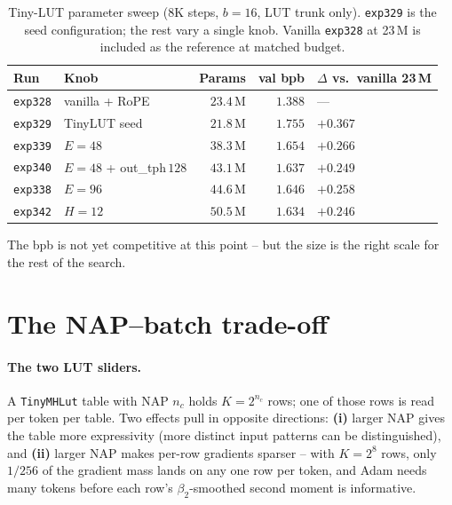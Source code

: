 \documentclass[11pt]{article}
\begin{document}
\begin{table}[!ht]
\caption{Tiny-LUT parameter sweep (8K steps, $b{=}16$, LUT trunk only). \texttt{exp329} is the seed configuration; the rest vary a single knob. Vanilla \texttt{exp328} at 23\,M is included as the reference at matched budget.}
\label{tab:tiny}
\centering\small
\begin{tabular}{llrrl}
\toprule
Run & Knob & Params & val bpb & $\Delta$ vs.\ vanilla 23\,M \\
\midrule
\texttt{exp328} & vanilla + RoPE          & $23.4$\,M & $1.388$ & --- \\
\midrule
\texttt{exp329} & TinyLUT seed            & $21.8$\,M & $1.755$ & $+0.367$ \\
\texttt{exp339} & $E{=}48$                & $38.3$\,M & $1.654$ & $+0.266$ \\
\texttt{exp340} & $E{=}48$ + out\_tph$\,128$    & $43.1$\,M & $1.637$ & $+0.249$ \\
\texttt{exp338} & $E{=}96$                & $44.6$\,M & $1.646$ & $+0.258$ \\
\texttt{exp342} & $H{=}12$                & $50.5$\,M & $1.634$ & $+0.246$ \\
\bottomrule
\end{tabular}
\end{table}

The bpb is not yet competitive at this point -- but the size is the right scale for the rest of the search.

\section{The NAP--batch trade-off}
\label{sec:nap_batch}

\paragraph{The two LUT sliders.}
A \texttt{TinyMHLut} table with NAP $n_c$ holds $K = 2^{n_c}$ rows; one of those rows is read per token per table.
Two effects pull in opposite directions:
\textbf{(i)} larger NAP gives the table more expressivity (more distinct input patterns can be distinguished), and
\textbf{(ii)} larger NAP makes per-row gradients sparser -- with $K{=}2^{8}$ rows, only $1/256$ of the gradient mass lands on any one row per token, and Adam needs many tokens before each row's $\beta_2$-smoothed second moment is informative.
\end{document}
